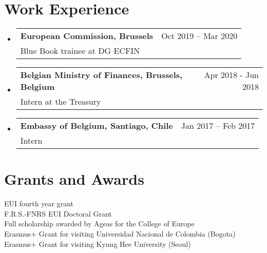 \documentclass[11pt]{article}
\makeatletter
\newcommand{\CVItem}[1]{
  \item\small{
    {#1 \vspace{-2pt}}
  }
}
\newcommand{\CVSubheading}[4]{
  \vspace{-2pt}\item
    \begin{tabular*}{0.97\textwidth}[t]{l@{\extracolsep{\fill}}r}
      \textbf{#1} & #2 \\
      \small#3 & \small #4 \\
    \end{tabular*}\vspace{-7pt}
}
\newcommand{\CVSubHeadingListStart}{\begin{itemize}[leftmargin=0.5cm, label={}]}
\newcommand{\CVSubHeadingListEnd}{\end{itemize}}
\newcommand{\CVItemListStart}{\begin{itemize}}
\newcommand{\CVItemListEnd}{\end{itemize}\vspace{-5pt}}
\makeatother
\begin{document}

\section{Work Experience}
  \CVSubHeadingListStart
    \CVSubheading
      {European Commission, Brussels}{Oct 2019 -- Mar 2020}
      {Blue Book trainee at DG ECFIN}{}
    \CVSubheading
      {Belgian Ministry of Finances, Brussels, Belgium}{Apr 2018 - Jun 2018}
      {Intern at the Treasury}{}
    \CVSubheading
      {Embassy of Belgium, Santiago, Chile}{Jan 2017 -- Feb 2017}
      {Intern}{}
  \CVSubHeadingListEnd





\section{Grants and Awards}
 \begin{itemize}[leftmargin=0.5cm, label={}]
    \small{\item{
EUI fourth year grant \\
 F.R.S.-FNRS EUI Doctoral Grant\\
Full scholarship awarded by Ageas for the College of Europe\\
Erasmus+ Grant for visiting Universidad Nacional de Colombia (Bogota) \\
Erasmus+ Grant for visiting Kyung Hee University (Seoul)
    }}
 \end{itemize}

\end{document}
